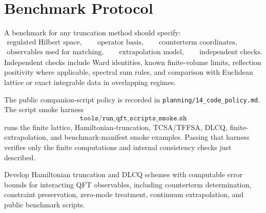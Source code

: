 \section{Benchmark Protocol}

A benchmark for any truncation method should specify:
\[
\begin{gathered}
  \text{regulated Hilbert space},\qquad
  \text{operator basis},\qquad
  \text{counterterm coordinates},\\
  \text{observables used for matching},\qquad
  \text{extrapolation model},\qquad
  \text{independent checks}.
\end{gathered}
\]
Independent checks include Ward identities, known finite-volume limits,
reflection positivity where applicable, spectral sum rules, and comparison
with Euclidean lattice or exact integrable data in overlapping regimes.

The public companion-script policy is recorded in
\texttt{planning/14\_code\_policy.md}.  The script smoke harness
\[
  \texttt{tools/run\_qft\_scripts\_smoke.sh}
\]
runs the finite lattice, Hamiltonian-truncation, TCSA/TFFSA, DLCQ,
finite-extrapolation, and benchmark-manifest smoke examples.  Passing that
harness verifies only the finite computations and internal consistency
checks just described.

\begin{openproblem}
\label{op:controlled-qft-hamiltonian-truncation}
Develop Hamiltonian truncation and DLCQ schemes with computable error bounds
for interacting QFT observables, including counterterm determination,
constraint preservation, zero-mode treatment, continuum extrapolation, and
public benchmark scripts.
\end{openproblem}
